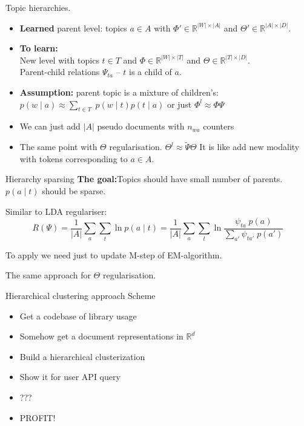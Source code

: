 \documentclass[10pt,aspectratio=1610]{beamer}
\begin{document}
\begin{frame}{Topic hierarchies.}
  \begin{itemize}
  \item \textbf{Learned} parent level: topics $a \in A$ with $\Phi' \in \mathbb{R}^{|W| \times |A|} $ and $\Theta' \in \mathbb{R}^{|A| \times |D|} $.
  \item \textbf{To learn:} \\
      \quad New level with topics $t \in T$ and $\Phi \in \mathbb{R}^{|W| \times |T|} $ and $\Theta \in \mathbb{R}^{|T| \times |D|} $.\\
      \quad Parent-child relations $\Psi_{ta}$  -- $t$ is a child of $a$.
  \pause
  \item \textbf{Assumption:} parent topic is a mixture of children's: \\[2mm]
  \qquad\qquad
  $\displaystyle
      p(w \mid a) \approx \sum_{t \in T} \; p(w \mid t) p(t \mid a)
  $
  \qquad or just \qquad
  $
    \Phi^l \approx  \Phi \Psi
  $
  \pause
  \item We can just add $|A|$ pseudo documents with $n_{wa}$ counters
  \pause
  \item The same point with $\Theta$ regularisation.
  $
  \Theta^l \approx \tilde \Psi \Theta
  $
  It is like add new modality with tokens corresponding to $a \in A$.
  \end{itemize}

\end{frame}

\begin{frame}{Hierarchy sparsing}
  \textbf{The goal:}\quad Topics should have small number of parents. \\[5mm]

  $p(a \mid t)$ should be sparse.
  
  Similar to LDA regulariser:
  $$
      R(\Psi) 
        = \dfrac{1}{|A|} \sum_a \sum_t \ln p(a \mid t)
        = \dfrac{1}{|A|} \sum_a \sum_t \ln 
            \dfrac{\psi_{ta} \; p(a)}{\sum_{a'} \psi_{ta'} \; p(a')}
  $$

  To apply we need just to update M-step of EM-algorithm.

  The same approach for $\Theta$ regularisation.
\end{frame}

\begin{frame}{Hierarchical clustering approach}
  Scheme
  \begin{itemize}
    \item Get a codebase of library usage
    \item \alert<2>{Somehow get a document representations in $\mathbb{R}^{d}$}
    \item Build a hierarchical clusterization
    \item Show it for user API query
    \item ???
    \item PROFIT!
  \end{itemize}
\end{frame}
\end{document}
